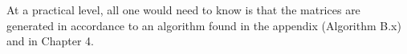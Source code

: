 At a practical level, all one would need to know is that the matrices are generated in accordance to an algorithm found in the appendix (Algorithm B.x) and in Chapter 4.



\begin{center}
  \Ddisttable
\end{center}
